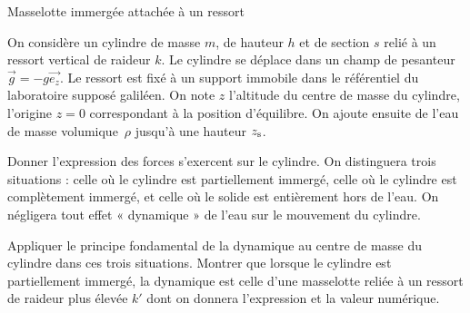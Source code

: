 \begin{exo}[MPSI]{Masselotte immergée attachée à un ressort}

On considère un cylindre de masse $m$, de hauteur $h$ et de section $s$ relié à un ressort vertical de raideur $k$. Le cylindre  se déplace dans un champ de pesanteur $\Vec{g} = -g \Vec{e_z}$. Le ressort est fixé à un support immobile dans le référentiel du laboratoire supposé galiléen. On note $z$ l'altitude du centre de masse du cylindre, l'origine $z=0$ correspondant à la position d'équilibre. On ajoute ensuite de l'eau de masse volumique~$\rho$ jusqu'à une hauteur $z_{\rm s}$.

\begin{center}

\end{center}


\begin{quest}
\item Donner l'expression des forces s'exercent sur le cylindre. On distinguera trois situations : celle où le cylindre est partiellement immergé, celle où le cylindre est complètement immergé, et celle où le solide est entièrement hors de l'eau. On négligera tout effet « dynamique » de l'eau sur le mouvement du cylindre.

\item Appliquer le principe fondamental de la dynamique au centre de masse du cylindre dans ces trois situations. Montrer que lorsque le cylindre est partiellement immergé, la dynamique est celle d'une masselotte reliée à un ressort de raideur plus élevée $k'$ dont on donnera l'expression et la valeur numérique.


\end{quest}
\end{exo}
